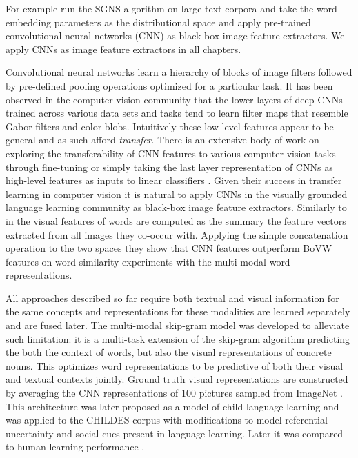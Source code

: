 For example \cite{kiela2014learning} run the SGNS algorithm
on large text corpora and take the word-embedding parameters
as the distributional space and
apply pre-trained convolutional neural networks (CNN) as black-box image
feature extractors. We apply CNNs as image feature extractors in all chapters.


Convolutional neural networks learn a hierarchy of blocks of image filters followed by
pre-defined pooling operations optimized for a particular task.
It has been observed in the computer vision community that the lower layers of
deep CNNs trained across various data sets and tasks tend to learn filter maps
that resemble Gabor-filters and color-blobs. Intuitively these low-level features appear to be general
and as such afford \emph{transfer}. There is an extensive body of work on exploring the transferability
of CNN features to various computer vision tasks through fine-tuning
 \citep{donahue2014decaf,oquab2014learning} or simply taking the last layer representation of CNNs
as high-level features as inputs to linear classifiers \citep{girshick2014rich,sharif2014cnn}.
Given their success in transfer learning in computer vision it is natural to apply CNNs in the
visually grounded language learning community as black-box image feature extractors.
Similarly to \cite{bruni2014multimodal} in
\cite{kiela2014learning} the visual features of words are computed as the summary the feature vectors
extracted from all images they co-occur with.
Applying the simple concatenation operation to the two spaces
they show that CNN features outperform BoVW features on word-similarity
experiments with the multi-modal word-representations.

All approaches described so far require both textual and visual information for the same concepts and
representations for these modalities are learned separately and are fused later.
The multi-modal skip-gram \citep{lazaridou2015combining} model was developed to alleviate such limitation:
it is a multi-task extension of the skip-gram algorithm predicting the both the context of words, but also
the visual representations of concrete nouns. This optimizes word representations to be predictive of
both their visual and textual contexts jointly. Ground truth visual representations are constructed by averaging
the CNN representations \citep{krizhevsky2012imagenet} of 100 pictures sampled from ImageNet \citep{deng2009imagenet}.
This architecture was later proposed as a model of child language learning and
was applied to the CHILDES corpus \cite{macwhinney2014childes} with modifications to model referential
uncertainty and social cues \citep{lazaridou2016multimodal} present in language learning.
Later it was compared to human learning performance \citep{lazaridou2017multimodal}.


